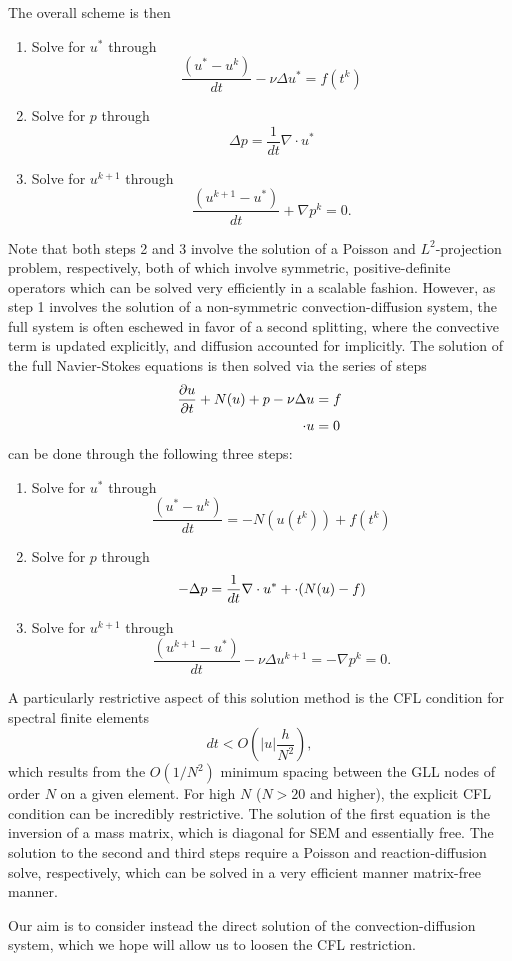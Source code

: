 \documentclass[final,leqno]{siamltex}
\newcommand{\LRp}[1]{\left( #1 \right)}
\newcommand{\LRb}[1]{\left| #1 \right|}
\let\grad\relax
\newcommand{\grad}{\nabla}
\renewcommand{\div}{\grad \cdot}
\newcommand{\pd}[2]{\frac{\partial#1}{\partial#2}}
\begin{document}
The overall scheme is then 
\begin{enumerate}
\item Solve for $u^*$ through $$\frac{(u^*-u^k)}{dt} - \nu\Delta u^* = f(t^k)$$
\item  Solve for $p$ through $$\Delta p = \frac{1}{dt}\nabla \cdot u^*$$
\item Solve for $u^{k+1}$ through $$\frac{(u^{k+1}-u^*)}{dt} + \nabla p^k = 0.$$
\end{enumerate}
Note that both steps 2 and 3 involve the solution of a Poisson and $L^2$-projection problem, respectively, both of which involve symmetric, positive-definite operators which can be solved very efficiently in a scalable fashion.  However, as step 1 involves the solution of a non-symmetric convection-diffusion system, the full system is often eschewed in favor of a second splitting, where the convective term is updated explicitly, and diffusion accounted for implicitly.  The solution of the full Navier-Stokes equations is then solved via the series of steps
\begin{align*}
\pd{u}{t} + N(u) + \grad p - \nu \Delta u &= f \\
\div u &= 0
\end{align*}
can be done through the following three steps:
\begin{enumerate}
\item Solve for $u^*$ through $$\frac{(u^*-u^k)}{dt} = - N(u(t^k)) + f(t^k)$$
\item  Solve for $p$ through $$-\Delta p = \frac{1}{dt}\nabla \cdot u^* + \div(N(u)-f)$$
\item Solve for $u^{k+1}$ through $$\frac{(u^{k+1}-u^*)}{dt} - \nu\Delta u^{k+1} = -\nabla p^k = 0.$$
\end{enumerate}
A particularly restrictive aspect of this solution method is the CFL condition for spectral finite elements
\[
dt < O\LRp{\LRb{u}\frac{h}{N^2}},
\]
which results from the $O(1/N^2)$ minimum spacing between the GLL nodes of order $N$ on a given element.  For high $N$ ($N>20$ and higher), the explicit CFL condition can be incredibly restrictive.  The solution of the first equation is the inversion of a mass matrix, which is diagonal for SEM and essentially free.  The solution to the second and third steps require a Poisson and reaction-diffusion solve, respectively, which can be solved in a very efficient manner matrix-free manner.  

Our aim is to consider instead the direct solution of the convection-diffusion system, which we hope will allow us to loosen the CFL restriction.  
\end{document}
